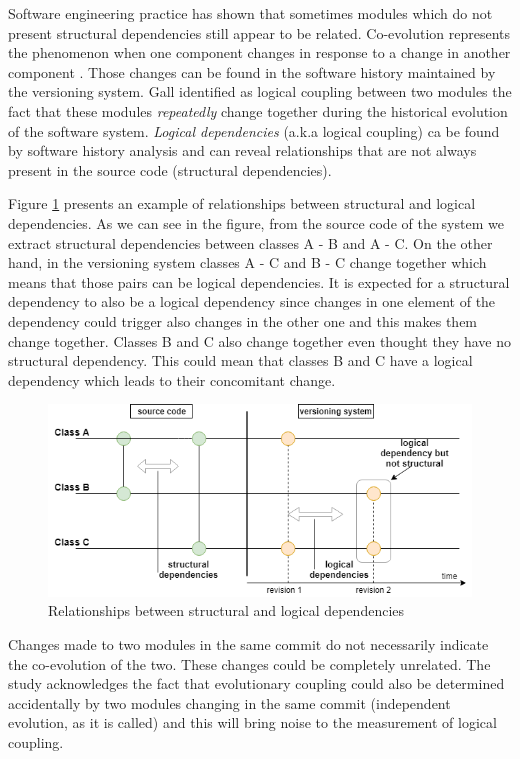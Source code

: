 \documentclass[conference]{IEEEtran}
\begin{document}
Software engineering practice has shown that sometimes modules which do not present structural dependencies still appear to be related. Co-evolution represents the phenomenon when one component changes in response to a change in another component \cite{Yu:2007:UCC:1231330.1231370}. Those changes can be found in the software history maintained by the versioning system. Gall \cite{Gall:1998:DLC:850947.853338} identified as logical coupling between two modules the fact that these modules  \textit{repeatedly} change together during the historical evolution of the software system. 
 \textit{Logical dependencies} (a.k.a logical coupling) ca be found by software history analysis and can reveal relationships that are not always present in the source code (structural dependencies).  

Figure \ref{fig:fig1} presents an example of relationships between structural and logical dependencies. As we can see in the figure, from the source code of the system we extract structural dependencies between classes A - B and A - C. On the other hand, in the versioning  system classes A - C and B - C change together which means that those pairs can be logical dependencies. It is expected for a structural dependency to also be a logical dependency since changes in one element of the dependency could trigger also changes in the other one and this makes them change together. Classes B and C also change together even thought they have no structural dependency. This could mean that classes B and C have a logical dependency which leads to their concomitant change.
\begin{figure}[h]
\includegraphics[scale=0.43]{fig1.png}
\caption{Relationships between structural and logical dependencies }
\label{fig:fig1}
\centering
\end{figure}

Changes made to two modules in the same commit do not necessarily indicate the co-evolution of the two. These changes could be completely unrelated. The study \cite{Yu2007} acknowledges the fact that evolutionary coupling could also be determined accidentally by two modules changing in the same commit (independent evolution, as it is called) and this will bring noise to the measurement of logical coupling. 
\end{document}
